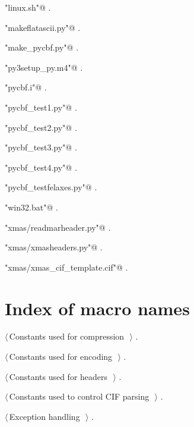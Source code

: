 \documentclass[10pt,a4paper,twoside,notitlepage]{article}
\begin{document}
{\small\begin{list}{}{\setlength{\itemsep}{-\parsep}\setlength{\itemindent}{-\leftmargin}}
\item \verb@"linux.sh"@ {\footnotesize {\NWtxtDefBy} .}
\item \verb@"makeflatascii.py"@ {\footnotesize {\NWtxtDefBy} .}
\item \verb@"make_pycbf.py"@ {\footnotesize {\NWtxtDefBy} .}
\item \verb@"py3setup_py.m4"@ {\footnotesize {\NWtxtDefBy} .}
\item \verb@"pycbf.i"@ {\footnotesize {\NWtxtDefBy} .
}
\item \verb@"pycbf_test1.py"@ {\footnotesize {\NWtxtDefBy} .}
\item \verb@"pycbf_test2.py"@ {\footnotesize {\NWtxtDefBy} .}
\item \verb@"pycbf_test3.py"@ {\footnotesize {\NWtxtDefBy} .}
\item \verb@"pycbf_test4.py"@ {\footnotesize {\NWtxtDefBy} .}
\item \verb@"pycbf_testfelaxes.py"@ {\footnotesize {\NWtxtDefBy} .}
\item \verb@"win32.bat"@ {\footnotesize {\NWtxtDefBy} .}
\item \verb@"xmas/readmarheader.py"@ {\footnotesize {\NWtxtDefBy} .}
\item \verb@"xmas/xmasheaders.py"@ {\footnotesize {\NWtxtDefBy} .}
\item \verb@"xmas/xmas_cif_template.cif"@ {\footnotesize {\NWtxtDefBy} .}
\end{list}}


\section*{Index of macro names}

{\small\begin{list}{}{\setlength{\itemsep}{-\parsep}\setlength{\itemindent}{-\leftmargin}}
\item $\langle\,$Constants used for compression\nobreak\ {\footnotesize {}}$\,\rangle$ {\footnotesize {\NWtxtRefIn} .}
\item $\langle\,$Constants used for encoding\nobreak\ {\footnotesize {}}$\,\rangle$ {\footnotesize {\NWtxtRefIn} .}
\item $\langle\,$Constants used for headers\nobreak\ {\footnotesize {}}$\,\rangle$ {\footnotesize {\NWtxtRefIn} .}
\item $\langle\,$Constants used to control CIF parsing\nobreak\ {\footnotesize {}}$\,\rangle$ {\footnotesize {\NWtxtRefIn} .}
\item $\langle\,$Exception handling\nobreak\ {\footnotesize {}}$\,\rangle$ {\footnotesize {\NWtxtRefIn} .}
\end{list}}
\end{document}
